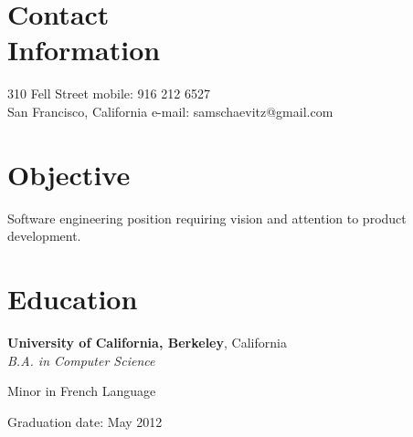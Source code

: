 \documentclass[margin,line]{resume}
\begin{document}
\begin{resume}

	\section{\mysidestyle Contact\\Information}

	310 Fell Street			\hfill mobile: 916 212 6527       		\vspace{0mm}\\\vspace{0mm}%
	San Francisco, California       \hfill e-mail: samschaevitz@gmail.com		\vspace{0mm}\\\vspace{-4.5mm}%

	\section{\mysidestyle Objective}
	Software engineering position requiring vision and attention to product development.

	\section{\mysidestyle Education}

	\textbf{University of California, Berkeley}, California \vspace{1mm}\\\vspace{0mm}%
	\textsl{B.A. in Computer Science} \hfill \textbf{}\vspace{-3mm}\\\vspace{-1mm}%
	\begin{list2}
		\item Minor in French Language
	\item Graduation date: May 2012
	\end{list2}\vspace{-1.5mm}



\end{resume}
\end{document}
